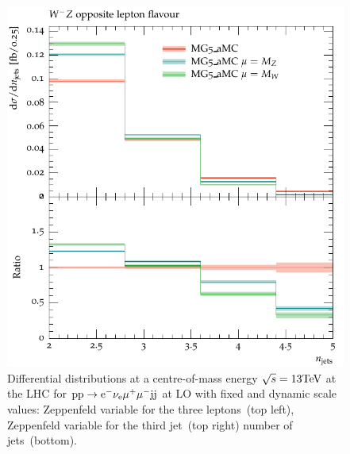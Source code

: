 \documentclass[11pt]{cernrep}
\begin{document}
\begin{figure}[htbp]
\begin{center}
   \includegraphics[scale=0.5]{figs/MG_WmZ_OF_nJets}
\caption{Differential distributions at a centre-of-mass energy $\sqrt{s}=13{\rm TeV}$ at the LHC for ${\rm p} {\rm p}
  \to {\rm e}^-  \nu_{\rm e}  \mu^+ \mu^- {\rm j} {\rm j}$ at LO with fixed and dynamic scale values:  
                Zeppenfeld variable for the three leptons~(top left),
                Zeppenfeld variable for the third jet~(top right)
                number of jets~(bottom).}
\label{vbs_fig_shower_2b}
\end{center}
\end{figure}
\end{document}
